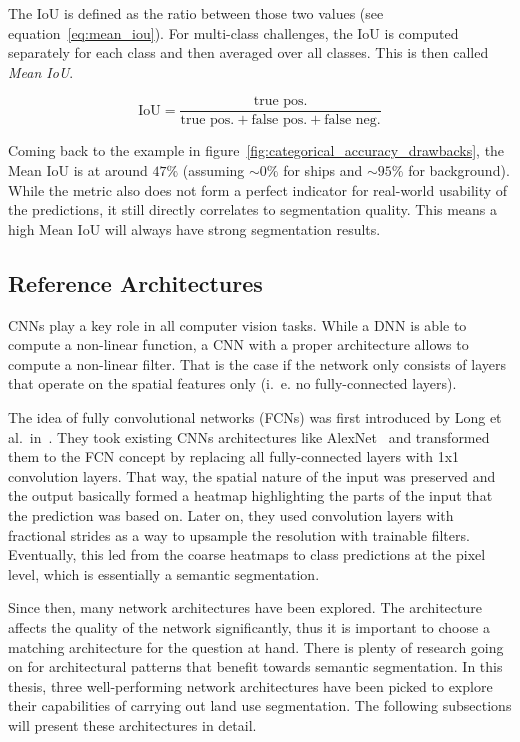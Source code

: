 The IoU is defined as the ratio between those two values (see equation~\ref{eq:mean_iou}). For multi-class challenges, the IoU is computed separately for each class and then averaged over all classes. This is then called \emph{Mean IoU}.

\begin{equation}
    \label{eq:mean_iou}
    \text{IoU} = \frac{\text{true pos.}}{\text{true pos.}+\text{false pos.}+\text{false neg.}}
\end{equation}

Coming back to the example in figure~\ref{fig:categorical_accuracy_drawbacks}, the Mean IoU is at around $47\%$ (assuming $\sim 0\%$ for ships and $\sim 95\%$ for background). While the metric also does not form a perfect indicator for real-world usability of the predictions, it still directly correlates to segmentation quality. This means a high Mean IoU will always have strong segmentation results.

\subsection{Reference Architectures}
\label{sec:ref_archs}
CNNs play a key role in all computer vision tasks. While a DNN is able to compute a non-linear function, a CNN with a proper architecture allows to compute a non-linear filter. That is the case if the network only consists of layers that operate on the spatial features only (i.~e. no fully-connected layers).

The idea of fully convolutional networks (FCNs) was first introduced by Long et al.\ in~\cite{fcn15}. They took existing CNNs architectures like AlexNet~\cite{alexnet12} and transformed them to the FCN concept by replacing all fully-connected layers with 1x1 convolution layers. That way, the spatial nature of the input was preserved and the output basically formed a heatmap highlighting the parts of the input that the prediction was based on. Later on, they used convolution layers with fractional strides as a way to upsample the resolution with trainable filters. Eventually, this led from the coarse heatmaps to class predictions at the pixel level, which is essentially a semantic segmentation.

Since then, many network architectures have been explored. The architecture affects the quality of the network significantly, thus it is important to choose a matching architecture for the question at hand. There is plenty of research going on for architectural patterns that benefit towards semantic segmentation. In this thesis, three well-performing network architectures have been picked to explore their capabilities of carrying out land use segmentation. The following subsections will present these architectures in detail.

